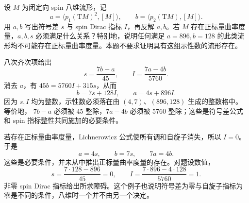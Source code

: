 \begin{optionalexercise}\label{g3:ex:spin-eight-dimensional-numbers}
	设 \(M\) 为闭定向 spin 八维流形，记
	\[
		a=\langle p_1(\mathrm TM)^2,[M]\rangle,\qquad
		b=\langle p_2(\mathrm TM),[M]\rangle.
	\]
	用 \(a,b\) 写出符号差 \(s\) 与 spin Dirac 指标 \(I\)，再反解 \(a,b\)。若 \(M\) 存在正标量曲率度量，\(a,b,s\) 必须满足什么关系？特别地，说明任何满足 \(a=896,b=128\) 的此类流形均不可能存在正标量曲率度量。本题不要求证明具有这组示性数的流形存在。
\end{optionalexercise}
\begin{solution}
	八次齐次项给出
	\[
		s=\frac{7b-a}{45},\qquad
		I=\frac{7a-4b}{5760}.
	\]
	消去 \(a\)，有
	\(45b=5760I+315s\)，从而
	\[
		b=7s+128I,\qquad a=4s+896I.
	\]
	因为 \(s,I\) 均为整数，示性数必须落在由
	\((4,7)\)、\((896,128)\) 生成的整数格中。等价地，
	\(7b-a\) 必须被 \(45\) 整除，\(7a-4b\) 必须被 \(5760\) 整除；这些是符号差公式和 spin 指标整性共同施加的必要条件。

	若存在正标量曲率度量，Lichnerowicz 公式使所有调和自旋子消失，所以 \(I=0\)。于是
	\[
		a=4s,\qquad b=7s,\qquad 7a=4b.
	\]
	这些是必要条件，并未从中推出正标量曲率度量的存在。对题设数值，
	\[
		s=\frac{7\cdot128-896}{45}=0,\qquad
		I=\frac{7\cdot896-4\cdot128}{5760}=1.
	\]
	非零 spin Dirac 指标给出所求障碍。这个例子也说明符号差为零与自旋子指标为零是不同的条件，八维时一个并不由另一个决定。
\end{solution}
